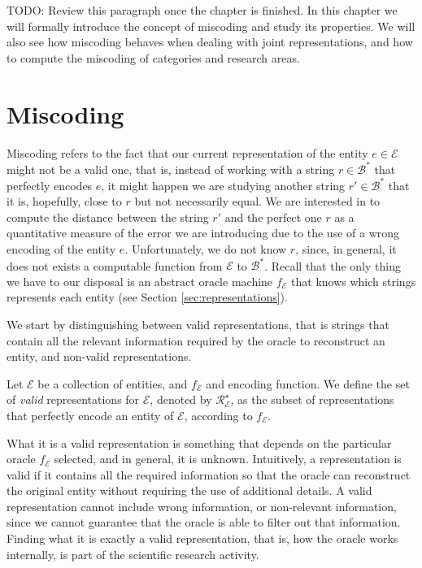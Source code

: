 {\color{red} TODO: Review this paragraph once the chapter is finished.} In this chapter we will formally introduce the concept of miscoding and study its properties. We will also see how miscoding behaves when dealing with joint representations, and how to compute the miscoding of categories and research areas.

%
%
\section{Miscoding}
\label{sec:miscoding}

Miscoding refers to the fact that our current representation of the entity $e \in \mathcal{E}$ might not be a valid one, that is, instead of working with a string $r \in \mathcal{B}^\ast$ that perfectly encodes $e$, it might happen we are studying another string $r' \in \mathcal{B}^\ast$ that it is, hopefully, close to $r$ but not necessarily equal. We are interested in to compute the distance between the string $r'$ and the perfect one $r$ as a quantitative measure of the error we are introducing due to the use of a wrong encoding of the entity $e$. Unfortunately, we do not know $r$, since, in general, it does not exists a computable function from $\mathcal{E}$ to $\mathcal{B}^\ast$. Recall that the only thing we have to our disposal is an abstract oracle machine $f_\mathcal{E}$ that knows which strings represents each entity (see Section \ref{sec:representations}).

We start by distinguishing between valid representations, that is strings that contain all the relevant information required by the oracle to reconstruct an entity, and non-valid representations.

\begin{definition}
Let $\mathcal{E}$ be a collection of entities, and $f_\mathcal{E}$ and encoding function. We define the set of \emph{valid} representations for $\mathcal{E}$, denoted by $\mathcal{R}^\star_\mathcal{E}$, as the subset of representations that perfectly encode an entity of $\mathcal{E}$, according to $f_\mathcal{E}$.
\end{definition}

What it is a valid representation is something that depends on the particular oracle $f_\mathcal{E}$ selected, and in general, it is unknown. Intuitively, a representation is valid if it contains all the required information so that the oracle can reconstruct the original entity without requiring the use of additional details. A valid representation cannot include wrong information, or non-relevant information, since we cannot guarantee that the oracle is able to filter out that information. Finding what it is exactly a valid representation, that is, how the oracle works internally, is part of the scientific research activity.


